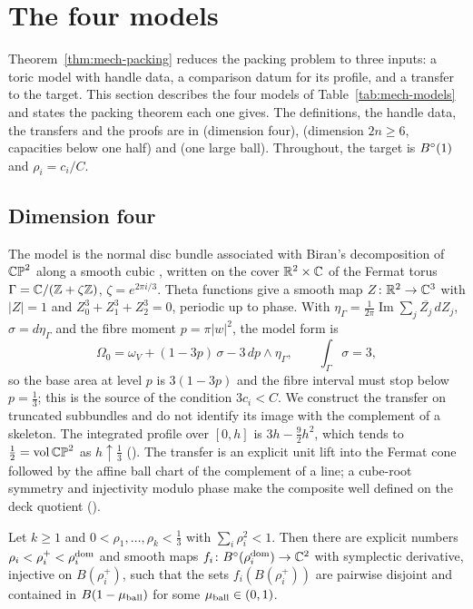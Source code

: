 \section{The four models}\label{sec:mdl}

Theorem~\ref{thm:mech-packing} reduces the packing problem to three inputs: a toric model with handle data, a
comparison datum for its profile, and a transfer to the target. This section describes the four models of
Table~\ref{tab:mech-models} and states the packing theorem each one gives. The definitions, the handle data, the
transfers and the proofs are in  (dimension four),  (dimension $2n\ge6$, capacities
below one half) and  (one large ball). Throughout, the target is $B^{\circ}(1)$ and $\rho_i=c_i/C$.

\subsection{Dimension four}\label{sec:mdl-cub}

The model is the normal disc bundle associated with Biran's decomposition of $\mathbb{CP}^2$ along a smooth cubic
\cite{Biran2001}, written on the cover
$\mathbb{R}^2\times\mathbb{C}$ of the Fermat torus $\Gamma=\mathbb{C}/(\mathbb{Z}+\zeta\mathbb{Z})$, $\zeta=e^{2\pi i/3}$. Theta functions give a smooth
map $Z\colon\mathbb{R}^2\to\mathbb{C}^3$ with $|Z|=1$ and $Z_0^3+Z_1^3+Z_2^3=0$, periodic up to phase. With
$\eta_\Gamma=\frac1{2\pi}\operatorname{Im}\sum_j\overline{Z_j}\,dZ_j$, $\sigma=d\eta_\Gamma$ and the fibre moment $p=\pi|w|^2$,
the model form is
\[
 \Omega_0=\omega_V+(1-3p)\,\sigma-3\,dp\wedge\eta_\Gamma ,\qquad \int_\Gamma\sigma=3,
\]
so the base area at level $p$ is $3(1-3p)$ and the fibre interval must stop below $p=\frac13$; this is the
source of the condition $3c_i<C$. We construct the transfer on truncated subbundles and do not identify its image
with the complement of a skeleton. The integrated profile over $[0,h]$ is $3h-\frac92h^2$, which tends to
$\frac12=\operatorname{vol}\mathbb{CP}^2$ as $h\uparrow\frac13$ (). The transfer is an explicit unit lift into
the Fermat cone followed by the affine ball chart of the complement of a line; a cube-root symmetry and
injectivity modulo phase make the composite well defined on the deck quotient
().

\begin{theorem}\label{thm:mdl-cub}
Let $k\ge1$ and $0<\rho_1,\dots,\rho_k<\frac13$ with $\sum_i\rho_i^2<1$. Then there are explicit numbers
$\rho_i<\rho_i^+<\rho_i^{\rm dom}$ and smooth maps $f_i\colon B^{\circ}(\rho_i^{\rm dom})\to\mathbb{C}^2$ with symplectic derivative, injective
on $B(\rho_i^+)$, such that the sets $f_i(B(\rho_i^+))$ are pairwise disjoint and contained in $B(1-\mu_{\rm ball})$ for some
$\mu_{\rm ball}\in(0,1)$.
\end{theorem}

